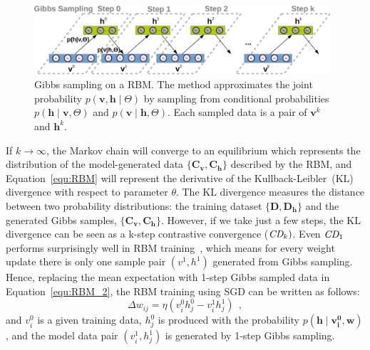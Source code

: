 \begin{figure}[hbt]
	\centering
	\includegraphics[width=0.98\textwidth]{pics_sdlm/gibbs_sampling.pdf}
	\caption[Gibbs sampling on a RBM.]{Gibbs sampling on a RBM. The method approximates the joint probability $p( \mathbf{v}, \mathbf{h} \mid  \Theta)$ by sampling from conditional probabilities $p( \mathbf{h} \mid  \mathbf{v}, \Theta)$ and $p( \mathbf{v} \mid  \mathbf{h}, \Theta)$. Each sampled data is a pair of $ \mathbf{v}^k$ and $\mathbf{h}^k$.}
	\label{fig:gibbs}
\end{figure}

If $ k \to \infty $, the Markov chain will converge to an equilibrium which represents the distribution of the model-generated data $\{\mathbf{C_v}, \mathbf{C_h}\}$ described by the RBM, and Equation~\ref{equ:RBM} will represent the derivative of the Kullback-Leibler~(KL) divergence with respect to parameter $\theta$.
The KL divergence measures the distance between two probability distributions: the training dataset $\{\mathbf{D}, \mathbf{D_h}\}$ and the generated Gibbs samples, $\{\mathbf{C_v}, \mathbf{C_h}\}$.
However, if we take just a few steps, the KL divergence can be seen as a k-step contrastive convergence ($ \textit{\textrm{CD}}_{k}) $.
Even $ \textit{\textrm{CD}}_1 $ performs surprisingly well in RBM training~\citep{hinton2002training}, which means for every weight update there is only one sample pair $(v^1, h^1)$ generated from Gibbs sampling.
Hence, replacing the mean expectation with 1-step Gibbs sampled data in Equation~\ref{equ:RBM_2}, the RBM training using SGD can be written as follows:
\begin{equation}
\Delta w_{ij} = \eta (v^0_i h^0_j-v^1_i h^1_j)~~,
\label{equ:rbm_train}
\end{equation}
and $v^0_i$ is a given training data, $h^0_j$ is produced with the probability $p( \mathbf{h} \mid \mathbf{v^0_i}, \mathbf{w})$, and the model data pair $(v^1_i, h^1_j)$ is generated by 1-step Gibbs sampling.


